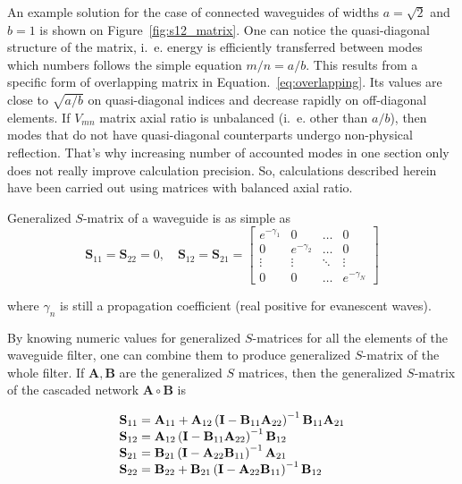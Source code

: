 \documentclass{pj}
\begin{document}
An example solution for the case of connected waveguides of widths
$a = \sqrt{2}$ and $b = 1$ is shown on
Figure~\ref{fig:s12_matrix}. One can notice the quasi-diagonal
structure of the matrix, i.~e. energy is efficiently transferred
between modes which numbers follows the simple equation $m/n =
a/b$. This results from a specific form of overlapping matrix in
Equation.~\ref{eq:overlapping}. Its values are close to $\sqrt{a/b}$
on quasi-diagonal indices and decrease rapidly on off-diagonal
elements. If $V_{mn}$ matrix axial ratio is unbalanced (i.~e. other than
$a/b$), then modes that do not have quasi-diagonal counterparts
undergo non-physical reflection. That's why increasing number of
accounted modes in one section only does not really improve
calculation precision. So, calculations described herein have been
carried out using matrices with balanced axial ratio.

Generalized $S$-matrix of a waveguide is as simple as
\begin{equation}
  \label{eq:waveguide_element}
  \mathbf{S}_{11} = \mathbf{S}_{22} = 0, \quad
  \mathbf{S}_{12} = \mathbf{S}_{21} = 
  \begin{bmatrix}
    e^{-\gamma_1} & 0 & \dots & 0 \\
    0 & e^{-\gamma_2} & \dots & 0 \\
    \vdots & \vdots & \ddots & \vdots \\
    0 & 0 & \dots & e^{-\gamma_N}
  \end{bmatrix}
\end{equation}

where $\gamma_n$ is still a propagation coefficient (real positive for
evanescent waves).

By knowing numeric values for generalized $S$-matrices for all the
elements of the waveguide filter, one can combine them to produce
generalized $S$-matrix of the whole filter. If
$\mathbf{A}, \mathbf{B}$ are the generalized $S$ matrices, then the
generalized $S$-matrix of the cascaded network
$\mathbf{A} \circ \mathbf{B}$ is

\begin{equation}
  \begin{array}{r@{}l}
    \mathbf{S}_{11} &{}=  \mathbf{A}_{11} + \mathbf{A}_{12} \left(\mathbf{I} - \mathbf{B}_{11}\mathbf{A}_{22}\right)^{-1} \mathbf{B}_{11} \mathbf{A}_{21} \\
    \mathbf{S}_{12} &{}=  \mathbf{A}_{12} \left(\mathbf{I} - \mathbf{B}_{11}\mathbf{A}_{22}\right)^{-1} \mathbf{B}_{12} \\
    \mathbf{S}_{21} &{}=  \mathbf{B}_{21} \left(\mathbf{I} - \mathbf{A}_{22}\mathbf{B}_{11}\right)^{-1}\mathbf{A}_{21} \\
    \mathbf{S}_{22} &{}=  \mathbf{B}_{22} + \mathbf{B}_{21}\left(\mathbf{I} - \mathbf{A}_{22}\mathbf{B}_{11}\right)^{-1}\mathbf{B}_{12} \\
  \end{array}
  \label{eq:cascaded_s}  
\end{equation}
\end{document}
